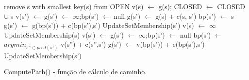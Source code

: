 \newpage
\begin{algorithm}[H]
\SetAlgoLined
{
	remove s with smallest key(s) from OPEN\;
	{
		v(s) $\leftarrow$ g(s); CLOSED $\leftarrow$ CLOSED $\cup$ {s}\;
		{
			{
				v(s') $\leftarrow$ g(s') $\leftarrow$ $\infty$;bp(s') $\leftarrow$ null\;
			}
			{
				g(s') $\leftarrow$ g(s) + c(s, s')\;
				bp(s') $\leftarrow$ s\;
				g(s') $\leftarrow$ g(bp(s')) + c(bp(s'),s')\; UpdateSetMembership(s')\;
			}
		}
	}
	{
		v(s) $\leftarrow$ $\infty$\; UpdateSetMembership(s)\;	
		{
			{
				v(s') $\leftarrow$ g(s') $\leftarrow$ $\infty$;bp(s') $\leftarrow$ null\;
			}
			{
				bp(s') $\leftarrow$ $argmin_{s'' \in pred(s')}$ v(s'') + c(s'',s')\;
				g(s') $\leftarrow$ v(bp(s')) + c(bp(s'),s')\; UpdateSetMembership(s')\;
			}
		}
	}
}
\caption{ComputePath() - função de cálculo de caminho.}
\end{algorithm}


